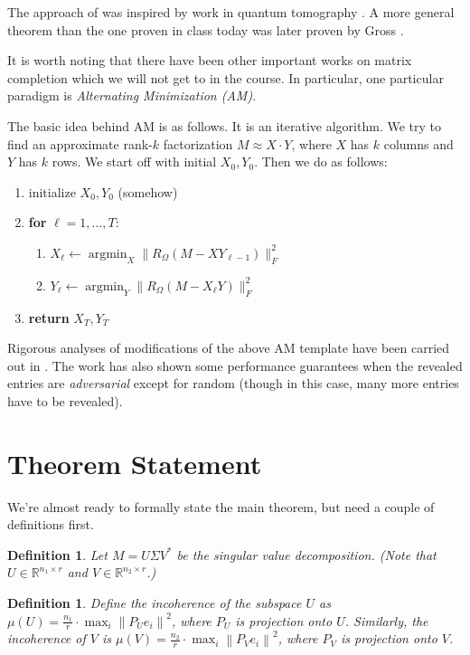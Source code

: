 \documentclass[11pt]{article}
\newcommand{\norm}[1]{\left\| #1 \right\|}
\newtheorem{definition}[theorem]{Definition}
\begin{document}
The approach of \cite{recht2011simpler} was inspired by work in quantum tomography \cite{GLF+10}. A more general theorem than the one proven in class today was later proven by Gross \cite{Gross11}.

It is worth noting that there have been other important works on matrix completion which we will not get to in the course. In particular, one particular paradigm is {\em Alternating Minimization (AM)}.

The basic idea behind AM is as follows. It is an iterative algorithm. We try to find an approximate rank-$k$ factorization $M \approx X\cdot Y$, where $X$ has $k$ columns and $Y$ has $k$ rows. We start off with initial $X_0, Y_0$. Then we do as follows:
\begin{enumerate}
\item initialize $X_0, Y_0$ (somehow)
\item \textbf{for} $\ell = 1,\ldots, T$:
\begin{enumerate}
\item $X_\ell \leftarrow \mathop{argmin}_X \|R_\Omega(M - XY_{\ell - 1})\|_F^2$
\item $Y_\ell \leftarrow \mathop{argmin}_Y \|R_\Omega(M - X_\ell Y)\|_F^2$
\end{enumerate}
\item \textbf{return} $X_T, Y_T$
\end{enumerate}

Rigorous analyses of modifications of the above AM template have been carried out in \cite{Hardt14,HardtW14}. The work \cite{SchrammW15} has also shown some performance guarantees when the revealed entries are {\em adversarial} except for random (though in this case, many more entries have to be revealed).

\section{Theorem Statement}

We're almost ready to formally state the main theorem, but need a couple of definitions first.
\begin{definition}
Let $M = U \Sigma V^*$ be the singular value decomposition. (Note that $U \in \mathbb{R}^{n_1 \times r}$ and $V \in \mathbb{R}^{n_2 \times r}$.)
\end{definition}
\begin{definition}
Define the incoherence of the subspace $U$ as $\mu(U) = \frac{n_1}{r} \cdot \max_i \norm{P_U e_i}^2$, where $P_U$ is projection onto $U$.
Similarly, the incoherence of $V$ is $\mu(V) = \frac{n_2}{r} \cdot \max_i \norm{P_V e_i}^2$, where $P_V$ is projection onto $V$.
\end{definition}
\end{document}
